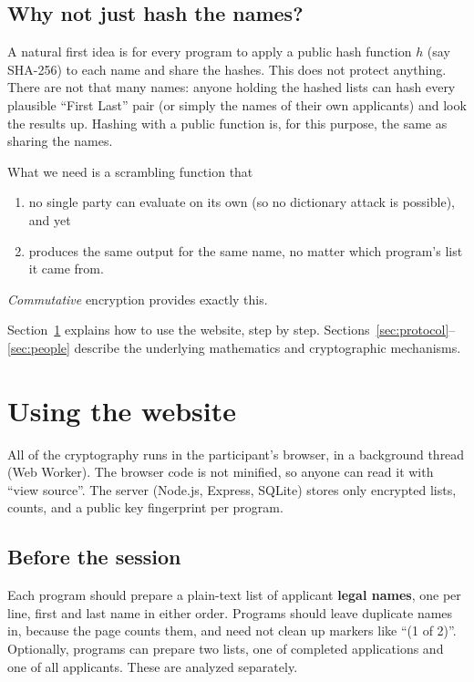 \documentclass[11pt]{article}
\begin{document}
\subsection*{Why not just hash the names?}

A natural first idea is for every program to apply a public hash function $h$ (say SHA-256) to each
name and share the hashes. This does not protect anything. There are not that many names: anyone
holding the hashed lists can hash every plausible ``First Last'' pair (or simply the names of
their own applicants) and look the results up. Hashing with a public function is, for this
purpose, the same as sharing the names.

What we need is a scrambling function that
\begin{enumerate}[nosep]
  \item no single party can evaluate on its own (so no dictionary attack is possible), and yet
  \item produces the same output for the same name, no matter which program's list it came from.
\end{enumerate}
\emph{Commutative} encryption provides exactly this.

Section~\ref{sec:website} explains how to use the website, step by step.
Sections~\ref{sec:protocol}--\ref{sec:people} describe the underlying mathematics and
cryptographic mechanisms.

\section{Using the website}\label{sec:website}

All of the cryptography runs in the participant's browser, in a background thread (Web Worker).
The browser code is not minified, so anyone can read it with ``view source''. The server
(Node.js, Express, SQLite) stores only encrypted lists, counts, and a public key fingerprint per
program.

\subsection{Before the session}

Each program should prepare a plain-text list of applicant \textbf{legal names}, one per line,
first and last name in either order. Programs should leave duplicate names in, because the page
counts them, and need not clean up markers like ``(1 of 2)''. Optionally, programs can prepare two
lists, one of completed applications and one of all applicants. These are analyzed separately.
\end{document}

